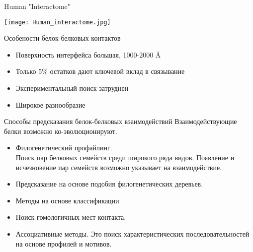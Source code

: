 
\begin{frame}
[plain]
  \titlepage
\end{frame}


\begin{frame}{Human "Interactome"}
        \begin{center}
          \texttt{[image: Human\_interactome.jpg]}
        \end{center}
\end{frame}

\begin{frame}{Особености белок-белковых контактов}
    \begin{itemize}
        \item Поверхность интерфейса большая, 1000-2000 \AA{} 
        \item Только 5\% остатков дают ключевой вклад в связывание
        \item Экспериментальный поиск затруднен
        \item Широкое разнообразие
        \end{itemize}
    \end{frame}

\begin{frame}{Способы предсказания белок-белковых взаимодействий}
    Взаимодействующие белки возможно ко-эволюционируют.
    \begin{itemize}
        \item Филогенетический профайлинг.\\
            Поиск пар белковых семейств среди широкого ряда видов. Появление и исчезновение пар семейств возможно
            указывает на взаимодействие.

        \item Предсказание на основе подобия филогенетических деревьев.
        \item Методы на основе классификации.
        \item Поиск гомологичных  мест контакта.
        \item Ассоциативные методы. Это поиск характеристических  последовательностей на основе профилей и мотивов.
    \end{itemize}
\end{frame}

